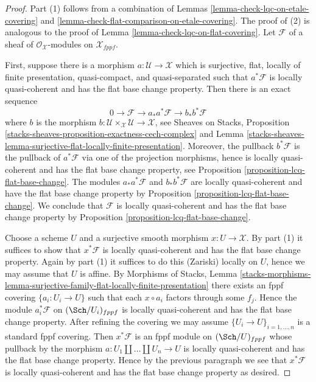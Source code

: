 \begin{proof}
Part (1) follows from a combination of
Lemmas \ref{lemma-check-lqc-on-etale-covering} and
\ref{lemma-check-flat-comparison-on-etale-covering}.
The proof of (2) is analogous to the proof of
Lemma \ref{lemma-check-lqc-on-flat-covering}.
Let $\mathcal{F}$ of a sheaf of $\mathcal{O}_\mathcal{X}$-modules
on $\mathcal{X}_{fppf}$.

\medskip\noindent
First, suppose there is a morphism $a : \mathcal{U} \to \mathcal{X}$
which is surjective, flat, locally of finite presentation, quasi-compact,
and quasi-separated such that $a^*\mathcal{F}$ is locally quasi-coherent
and has the flat base change property.
Then there is an exact sequence
$$
0 \to \mathcal{F} \to a_*a^*\mathcal{F} \to b_*b^*\mathcal{F}
$$
where $b$ is the morphism
$b : \mathcal{U} \times_\mathcal{X} \mathcal{U} \to \mathcal{X}$, see
Sheaves on Stacks, Proposition
\ref{stacks-sheaves-proposition-exactness-cech-complex} and
Lemma \ref{stacks-sheaves-lemma-surjective-flat-locally-finite-presentation}.
Moreover, the pullback $b^*\mathcal{F}$ is the pullback of $a^*\mathcal{F}$
via one of the projection morphisms, hence is locally quasi-coherent
and has the flat base change property, see
Proposition \ref{proposition-lcq-flat-base-change}.
The modules $a_*a^*\mathcal{F}$ and $b_*b^*\mathcal{F}$ are locally
quasi-coherent and have the flat base change property by
Proposition \ref{proposition-lcq-flat-base-change}.
We conclude that $\mathcal{F}$ is locally quasi-coherent and
has the flat base change property by
Proposition \ref{proposition-lcq-flat-base-change}.

\medskip\noindent
Choose a scheme $U$ and a surjective smooth morphism $x : U \to \mathcal{X}$.
By part (1) it suffices to show that $x^*\mathcal{F}$ is locally
quasi-coherent and has the flat base change property.
Again by part (1) it suffices to do this (Zariski) locally on $U$,
hence we may assume that $U$ is affine. By
Morphisms of Stacks, Lemma
\ref{stacks-morphisms-lemma-surjective-family-flat-locally-finite-presentation}
there exists an fppf covering $\{a_i : U_i \to U\}$ such that
each $x \circ a_i$ factors through some $f_j$. Hence the module
$a_i^*\mathcal{F}$ on $(\Sch/U_i)_{fppf}$
is locally quasi-coherent and has the flat base change property.
After refining the covering we may assume $\{U_i \to U\}_{i = 1, \ldots, n}$
is a standard fppf covering. Then $x^*\mathcal{F}$ is an fppf
module on $(\Sch/U)_{fppf}$ whose pullback by the morphism
$a : U_1 \amalg \ldots \amalg U_n \to U$ is locally quasi-coherent
and has the flat base change property.
Hence by the previous paragraph we see that $x^*\mathcal{F}$ is locally
quasi-coherent and has the flat base change property as desired.
\end{proof}






